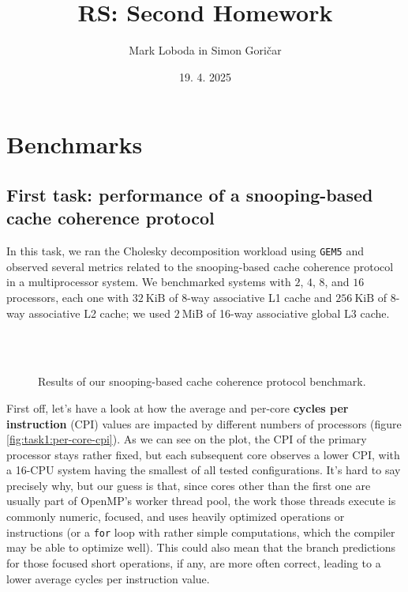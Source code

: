 \documentclass[10pt]{article}
\title{RS: Second Homework}
\author{
    Mark Loboda in Simon Goričar
}
\date{19. 4. 2025}
\begin{document}
\maketitle

\section{Benchmarks}

\subsection{First task: performance of a snooping-based cache coherence protocol}
In this task, we ran the Cholesky decomposition workload using \texttt{GEM5} and observed several metrics related to the snooping-based cache coherence protocol in a multiprocessor system. We benchmarked systems with $2$, $4$, $8$, and $16$ processors, each one with $32~\text{KiB}$ of 8-way associative L1 cache and $256~\text{KiB}$ of 8-way associative L2 cache; we used $2~\text{MiB}$ of 16-way associative global L3 cache.


\begin{figure}[htbp]
    \centering
    \hfill
    \\
    
    \hfill
    \\

    \caption{Results of our snooping-based cache coherence protocol benchmark.}
    \label{fig:task1}
\end{figure}

First off, let's have a look at how the average and per-core \textbf{cycles per instruction} (CPI) values are impacted by different numbers of processors (figure \ref{fig:task1:per-core-cpi}). As we can see on the plot, the CPI of the primary processor stays rather fixed, but each subsequent core observes a lower CPI, with a 16-CPU system having the smallest of all tested configurations. It's hard to say precisely why, but our guess is that, since cores other than the first one are usually part of OpenMP's worker thread pool, the work those threads execute is commonly numeric, focused, and uses heavily optimized operations or instructions (or a \texttt{for} loop with rather simple computations, which the compiler may be able to optimize well). This could also mean that the branch predictions for those focused short operations, if any, are more often correct, leading to a lower average cycles per instruction value.
\end{document}
